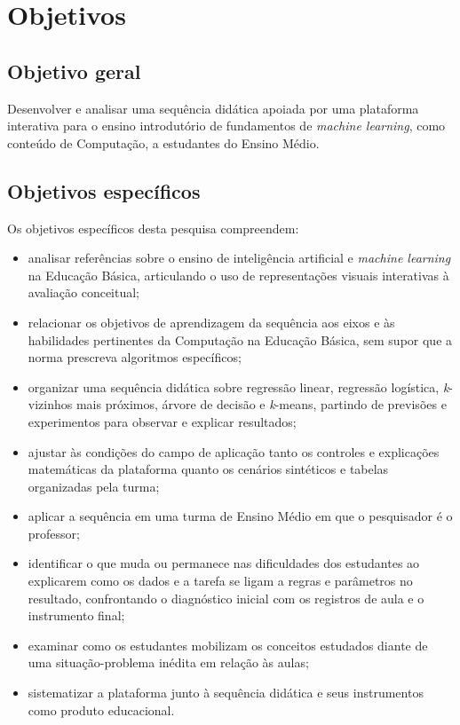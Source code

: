 \chapter{Objetivos}

\section{Objetivo geral}

Desenvolver e analisar uma sequência didática apoiada por uma plataforma interativa para o ensino introdutório de fundamentos de \textit{machine learning}, como conteúdo de Computação, a estudantes do Ensino Médio.

\section{Objetivos específicos}

Os objetivos específicos desta pesquisa compreendem:

\begin{itemize}
    \item analisar referências sobre o ensino de inteligência artificial e \textit{machine learning} na Educação Básica, articulando o uso de representações visuais interativas à avaliação conceitual;
    \item relacionar os objetivos de aprendizagem da sequência aos eixos e às habilidades pertinentes da Computação na Educação Básica, sem supor que a norma prescreva algoritmos específicos;
    \item organizar uma sequência didática sobre regressão linear, regressão logística, \textit{k}-vizinhos mais próximos, árvore de decisão e \textit{k}-means, partindo de previsões e experimentos para observar e explicar resultados;
    \item ajustar às condições do campo de aplicação tanto os controles e explicações matemáticas da plataforma quanto os cenários sintéticos e tabelas organizadas pela turma;
    \item aplicar a sequência em uma turma de Ensino Médio em que o pesquisador é o professor;
    \item identificar o que muda ou permanece nas dificuldades dos estudantes ao explicarem como os dados e a tarefa se ligam a regras e parâmetros no resultado, confrontando o diagnóstico inicial com os registros de aula e o instrumento final;
    \item examinar como os estudantes mobilizam os conceitos estudados diante de uma situação-problema inédita em relação às aulas;
    \item sistematizar a plataforma junto à sequência didática e seus instrumentos como produto educacional.
\end{itemize}
